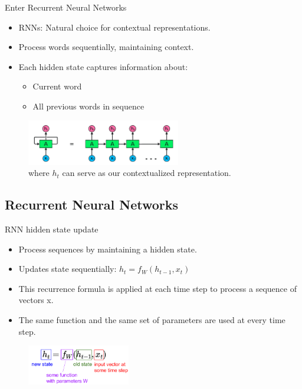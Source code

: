 \documentclass[serif, aspectratio=169]{beamer}
\begin{document}
\begin{frame}{Enter Recurrent Neural Networks}
    \begin{itemize}
        \item RNNs: Natural choice for contextual representations.
        \item Process words sequentially, maintaining context.
        \item Each hidden state captures information about:
        \begin{itemize}
            \item Current word
            \item All previous words in sequence
        \end{itemize}
    \end{itemize}

    \begin{figure}
        \centering
        \includegraphics[width=0.6\textwidth]{pic/image-RNN.png}
        \caption{where $h_t$ can serve as our contextualized representation.}
        \label{fig:image-RNN}
    \end{figure}
    
\end{frame}

\subsection{Recurrent Neural Networks}
\begin{frame}{RNN hidden state update}
    \begin{itemize}
        \item Process sequences by maintaining a hidden state.
        \item Updates state sequentially: $h_t = f_W(h_{t-1}, x_t)$
        \item This recurrence formula is applied at each time step to process a sequence of vectors x.
        \item The same function and the same set of parameters are used at every time step.
        
    \end{itemize}
     \begin{figure}
         \centering
         \includegraphics[width=0.4\textwidth]{pic/RNN-2.png}
     \end{figure}
\end{frame}
\end{document}

